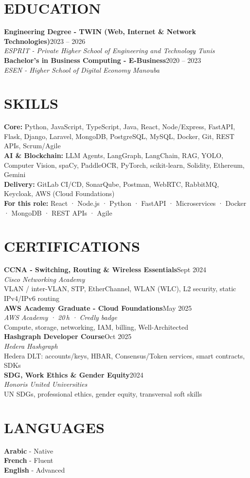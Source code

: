 \documentclass[10pt,a4paper]{article}
\newcommand{\TargetKeywords}{React · Node.js · Python · FastAPI · Microservices · Docker · MongoDB · REST APIs · Agile}
\newcommand{\edu}[3]{%
 \textbf{\color{primary}#1}\hfill{\color{muted}\small #2}\\[-1pt]
 {\color{accent}\textit{#3}}\\[3pt]
}
\newcommand{\cert}[4]{%
 \textbf{\color{primary}\small #1}\hfill{\color{muted}\scriptsize #3}\\[-1pt]
 {\color{accent}\small\textit{#2}}\\[0pt]
 {\color{muted}\scriptsize #4}\\[4pt]
}
\begin{document}
\section{EDUCATION}
\edu{Engineering Degree - TWIN (Web, Internet \& Network Technologies)}{2023 -- 2026}{ESPRIT - Private Higher School of Engineering and Technology \textbar{} Tunis}
\edu{Bachelor's in Business Computing - E-Business}{2020 -- 2023}{ESEN - Higher School of Digital Economy \textbar{} Manouba}

\section{SKILLS}
{\small
\textbf{\color{primary}Core:} Python, JavaScript, TypeScript, Java, React, Node/Express, FastAPI, Flask, Django, Laravel, MongoDB, PostgreSQL, MySQL, Docker, Git, REST APIs, Scrum/Agile\\[2pt]
\textbf{\color{primary}AI \& Blockchain:} LLM Agents, LangGraph, LangChain, RAG, YOLO, Computer Vision, spaCy, PaddleOCR, PyTorch, scikit-learn, Solidity, Ethereum, Gemini\\[2pt]
\textbf{\color{primary}Delivery:} GitLab CI/CD, SonarQube, Postman, WebRTC, RabbitMQ, Keycloak, AWS (Cloud Foundations)\\[2pt]
\textbf{\color{primary}For this role:} \TargetKeywords
}

\vspace{2pt}
\begin{minipage}[t]{0.68\textwidth}
\section{CERTIFICATIONS}
\cert{CCNA - Switching, Routing \& Wireless Essentials}{Cisco Networking Academy}{Sept 2024}{VLAN / inter-VLAN, STP, EtherChannel, WLAN (WLC), L2 security, static IPv4/IPv6 routing}
\cert{AWS Academy Graduate - Cloud Foundations}{AWS Academy · 20\,h · Credly badge}{May 2025}{Compute, storage, networking, IAM, billing, Well-Architected}
\cert{Hashgraph Developer Course}{Hedera Hashgraph}{Oct 2025}{Hedera DLT: accounts/keys, HBAR, Consensus/Token services, smart contracts, SDKs}
\cert{SDG, Work Ethics \& Gender Equity}{Honoris United Universities}{2024}{UN SDGs, professional ethics, gender equity, transversal soft skills}
\end{minipage}%
\hfill
\begin{minipage}[t]{0.28\textwidth}
\section{LANGUAGES}
{\small\textbf{Arabic} - Native}\\[2pt]
{\small\textbf{French} - Fluent}\\[2pt]
{\small\textbf{English} - Advanced}
\end{minipage}
\end{document}
